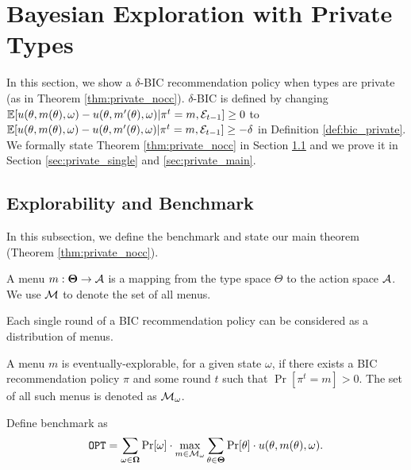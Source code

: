 
\section{Bayesian Exploration with Private Types}
\label{sec:private_nc}

In this section, we show a $\delta$-BIC recommendation policy when types are private (as in Theorem \ref{thm:private_nocc}). $\delta$-BIC is defined by changing $\mathbb{E}[ u(\theta,m(\theta),\omega) - u(\theta,m'(\theta),\omega)| \pi^t = m, \mathcal{E}_{t-1}] \geq 0$ to $\mathbb{E}[ u(\theta,m(\theta),\omega) - u(\theta,m'(\theta),\omega)| \pi^t = m, \mathcal{E}_{t-1}] \geq -\delta$ in Definition \ref{def:bic_private}. We formally state Theorem \ref{thm:private_nocc} in Section \ref{sec:private_bench} and we prove it in Section \ref{sec:private_single} and \ref{sec:private_main}.

\subsection{Explorability and Benchmark}
\label{sec:private_bench}
In this subsection, we define the benchmark and state our main theorem (Theorem \ref{thm:private_nocc}).

\begin{definition}
A menu $m: \bold{\Theta} \rightarrow \mathcal{A}$ is a mapping from the type space $\varTheta$ to the action space $\mathcal{A}$. We use $\mathcal{M}$ to denote the set of all menus.
\end{definition}

\begin{claim}
Each single round of a BIC recommendation policy can be considered as a distribution of menus.
\end{claim}

\begin{definition}
\label{def:private_exp}
A menu $m$ is eventually-explorable, for a given state $\omega$, if there exists a BIC recommendation policy $\pi$ and some round $t$ such that $\Pr[\pi^t= m]> 0$. The set of all such menus is denoted as $\mathcal{M}_{\omega}$.
\end{definition}

\begin{definition}[Benchmark]
Define benchmark as
\[
\mathtt{OPT} = \sum_{\omega\in \bold{\Omega}} \Pr[\omega] \cdot\max_{m \in \mathcal{M}_{\omega}}\sum_{\theta \in \bold{\Theta}} \Pr[\theta] \cdot  u(\theta, m(\theta), \omega).
\]
\end{definition}

